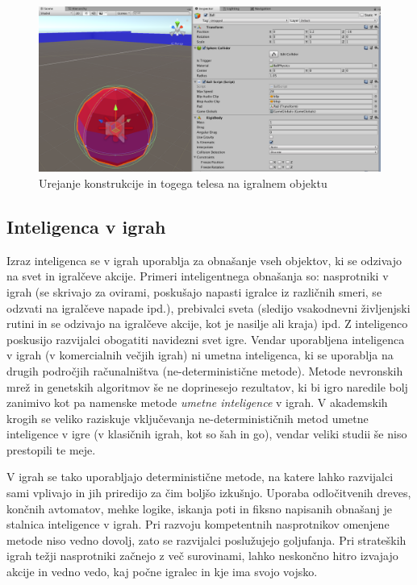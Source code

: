 \documentclass[12pt,a4paper,twoside]{book}
\begin{document}
\begin{figure}[h]
	\centering
	\includegraphics[width=15cm]{unityRigidbody}
	\caption{Urejanje konstrukcije in togega telesa na igralnem objektu}
	\label{slika:unityRigidbody}
\end{figure}

\subsection{Inteligenca v igrah}
Izraz inteligenca se v igrah uporablja za obnašanje vseh objektov, ki se odzivajo na svet in igralčeve akcije. Primeri inteligentnega obnašanja so: nasprotniki v igrah (se skrivajo za ovirami, poskušajo napasti igralce iz različnih smeri, se odzvati na igralčeve napade ipd.), prebivalci sveta (sledijo vsakodnevni življenjski rutini in se odzivajo na igralčeve akcije, kot je nasilje ali kraja) ipd. Z inteligenco poskusijo razvijalci obogatiti navidezni svet igre. Vendar uporabljena inteligenca v igrah (v komercialnih večjih igrah) ni umetna inteligenca, ki se uporablja na drugih področjih računalništva (ne-deterministične metode). Metode nevronskih mrež in genetskih algoritmov še ne doprinesejo rezultatov, ki bi igro naredile bolj zanimivo kot pa namenske metode \textit{umetne inteligence} v igrah. V akademskih krogih se veliko raziskuje vključevanja ne-determinističnih metod umetne inteligence v igre (v klasičnih igrah, kot so šah in go), vendar veliki studii še niso prestopili te meje. 

V igrah se tako uporabljajo deterministične metode, na katere lahko razvijalci sami vplivajo in jih priredijo za čim boljšo izkušnjo. Uporaba odločitvenih dreves, končnih avtomatov, mehke logike, iskanja poti in fiksno napisanih obnašanj je stalnica inteligence v igrah. Pri razvoju kompetentnih nasprotnikov omenjene metode niso vedno dovolj, zato se razvijalci poslužujejo goljufanja. Pri strateških igrah težji nasprotniki začnejo z več surovinami, lahko neskončno hitro izvajajo akcije in vedno vedo, kaj počne igralec in kje ima svojo vojsko.
\end{document}
